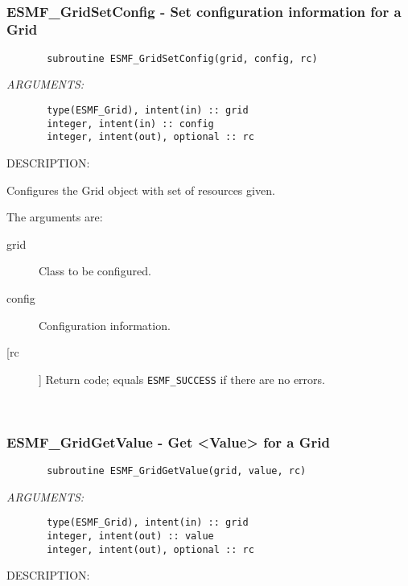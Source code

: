  
\mbox{}\hrulefill\ 
 
\subsubsection{ESMF\_GridSetConfig - Set configuration information for a Grid}


 
\begin{verbatim}       subroutine ESMF_GridSetConfig(grid, config, rc)\end{verbatim}{\em ARGUMENTS:}
\begin{verbatim}       type(ESMF_Grid), intent(in) :: grid
       integer, intent(in) :: config
       integer, intent(out), optional :: rc
 \end{verbatim}
{\sf DESCRIPTION:\\ }


       Configures the Grid object with set of resources given.
  
       The arguments are:
       \begin{description}
       \item[grid]
            Class to be configured.
       \item[config]
            Configuration information.
       \item[[rc]]
            Return code; equals {\tt ESMF\_SUCCESS} if there are no errors.
       \end{description}
   
 
\mbox{}\hrulefill\ 
 
\subsubsection{ESMF\_GridGetValue - Get <Value> for a Grid}


 
\begin{verbatim}       subroutine ESMF_GridGetValue(grid, value, rc)\end{verbatim}{\em ARGUMENTS:}
\begin{verbatim}       type(ESMF_Grid), intent(in) :: grid
       integer, intent(out) :: value
       integer, intent(out), optional :: rc
 \end{verbatim}
{\sf DESCRIPTION:\\ }


